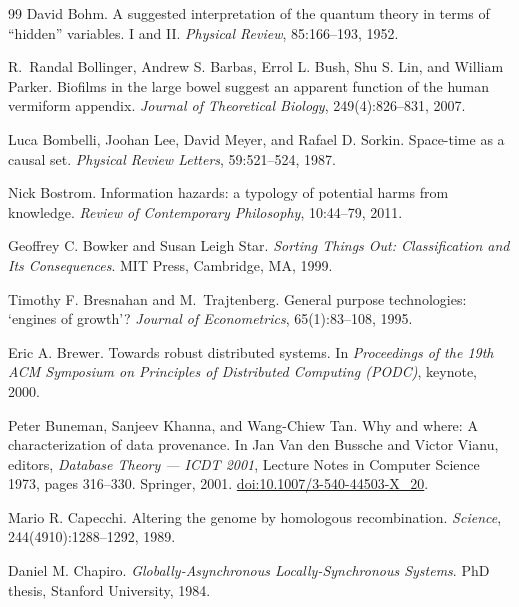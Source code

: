 \documentclass[11pt,a4paper]{article}
\theoremstyle{remark}\newtheorem{remark}[definition]{Remark}
\begin{document}
\begin{thebibliography}{99}
David Bohm.
\newblock A suggested interpretation of the quantum theory in terms of ``hidden'' variables. I and II.
\newblock \emph{Physical Review}, 85:166--193, 1952.

R.~Randal Bollinger, Andrew S. Barbas, Errol L. Bush, Shu S. Lin, and William Parker.
\newblock Biofilms in the large bowel suggest an apparent function of the human vermiform appendix.
\newblock \emph{Journal of Theoretical Biology}, 249(4):826--831, 2007.

Luca Bombelli, Joohan Lee, David Meyer, and Rafael D. Sorkin.
\newblock Space-time as a causal set.
\newblock \emph{Physical Review Letters}, 59:521--524, 1987.

Nick Bostrom.
\newblock Information hazards: a typology of potential harms from knowledge.
\newblock \emph{Review of Contemporary Philosophy}, 10:44--79, 2011.

Geoffrey C. Bowker and Susan Leigh Star.
\newblock \emph{Sorting Things Out: Classification and Its Consequences}.
\newblock MIT Press, Cambridge, MA, 1999.

Timothy F. Bresnahan and M.~Trajtenberg.
\newblock General purpose technologies: `engines of growth'?
\newblock \emph{Journal of Econometrics}, 65(1):83--108, 1995.

Eric A. Brewer.
\newblock Towards robust distributed systems.
\newblock In \emph{Proceedings of the 19th ACM Symposium on Principles of Distributed Computing (PODC)}, keynote, 2000.

Peter Buneman, Sanjeev Khanna, and Wang-Chiew Tan.
\newblock Why and where: A characterization of data provenance.
\newblock In Jan Van den Bussche and Victor Vianu, editors,
\emph{Database Theory --- ICDT 2001}, Lecture Notes in Computer Science
1973, pages 316--330. Springer, 2001.
\newblock \href{https://doi.org/10.1007/3-540-44503-X_20}{doi:10.1007/3-540-44503-X\_20}.

Mario R. Capecchi.
\newblock Altering the genome by homologous recombination.
\newblock \emph{Science}, 244(4910):1288--1292, 1989.

Daniel M. Chapiro.
\newblock \emph{Globally-Asynchronous Locally-Synchronous Systems}.
\newblock PhD thesis, Stanford University, 1984.


\end{thebibliography}
\end{document}
